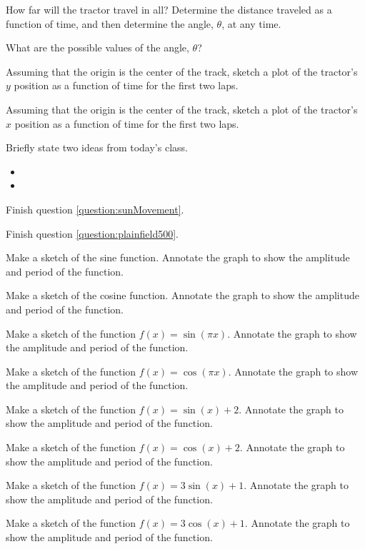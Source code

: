 \begin{problem}
  \begin{subproblem}
  \item How far will the tractor travel in all? Determine the distance
    traveled as a function of time, and then determine the angle,
    $\theta$, at any time.
    \vfill
  \item What are the possible values of the angle, $\theta$?
    \vspace{1em}
  \item Assuming that the origin is the center of the track, sketch a
    plot of the tractor's $y$ position as a function of time for the
    first two laps.
    \vfill
  \item Assuming that the origin is the center of the track, sketch a
    plot of the tractor's $x$ position as a function of time for the
    first two laps.
    \vfill
  \end{subproblem}
\end{problem}

\postClass

\begin{problem}
\item Briefly state two ideas from today's class.
  \begin{itemize}
  \item
  \item
  \end{itemize}
\item Finish question \ref{question:sunMovement}.
\item Finish question \ref{question:plainfield500}.
\item Make a sketch of the sine function. Annotate the graph to show
  the amplitude and period of the function.
\item Make a sketch of the cosine function. Annotate the graph to show
  the amplitude and period of the function.
\item Make a sketch of the function $f(x)=\sin(\pi x)$. Annotate the
  graph to show the amplitude and period of the function.
\item Make a sketch of the function $f(x)=\cos(\pi x)$. Annotate the
  graph to show the amplitude and period of the function.
\item Make a sketch of the function $f(x)=\sin(x)+2$. Annotate the
  graph to show the amplitude and period of the function.
\item Make a sketch of the function $f(x)=\cos(x)+2$. Annotate the
  graph to show the amplitude and period of the function.
\item Make a sketch of the function $f(x)=3\sin(x)+1$. Annotate the
  graph to show the amplitude and period of the function.
\item Make a sketch of the function $f(x)=3\cos(x)+1$. Annotate the
  graph to show the amplitude and period of the function.
\end{problem}


